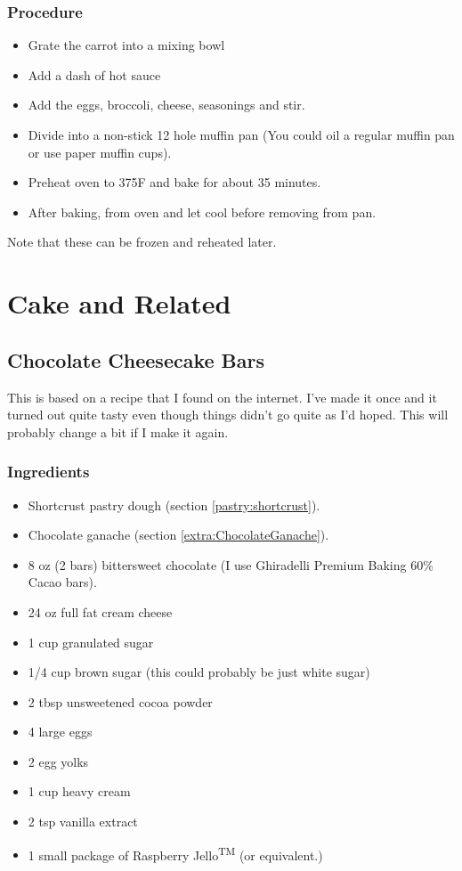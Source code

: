 \documentclass[10pt, openany]{book}
\begin{document}
\subsection{Procedure}
\begin{itemize}
  \item Grate the carrot into a mixing bowl
  \item Add a dash of hot sauce
  \item Add the eggs, broccoli, cheese, seasonings and stir.
  \item Divide into a non-stick 12 hole muffin pan (You could oil a regular muffin pan or use paper muffin cups).
  \item Preheat oven to 375\degree{}F and bake for about 35 minutes.
  \item After baking, from oven and let cool before removing from pan.
\end{itemize}

Note that these can be frozen and reheated later.

\chapter{Cake and Related}
\section{Chocolate Cheesecake Bars}
This is based on a recipe that I found on the internet.  I've made it once and it turned out quite tasty even though things didn't go quite as I'd hoped.  This will probably change a bit if I make it again.
\subsection{Ingredients}
\begin{itemize}
  \item Shortcrust pastry dough (section \ref{pastry:shortcrust}).
  \item Chocolate ganache (section \ref{extra:ChocolateGanache}).
  \item 8 oz (2 bars) bittersweet chocolate (I use Ghiradelli Premium Baking 60\% Cacao bars).
  \item 24 oz full fat cream cheese
  \item 1 cup granulated sugar
  \item 1/4 cup brown sugar (this could probably be just white sugar)
  \item 2 tbsp unsweetened cocoa powder
  \item 4 large eggs
  \item 2 egg yolks
  \item 1 cup heavy cream
  \item 2 tsp vanilla extract
  \item 1 small package of Raspberry Jello\textsuperscript{TM} (or equivalent.)
\end{itemize}
\end{document}
